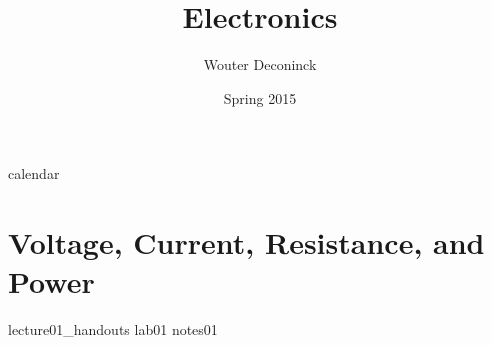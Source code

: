 \documentclass{book}
\title{Electronics}
\date{Spring 2015}
\author{Wouter Deconinck}
\begin{document}
\maketitle

{calendar}

\tableofcontents

\chapter{Voltage, Current, Resistance, and Power}
{lecture01_handouts}
{lab01}
{notes01}
\end{document}
